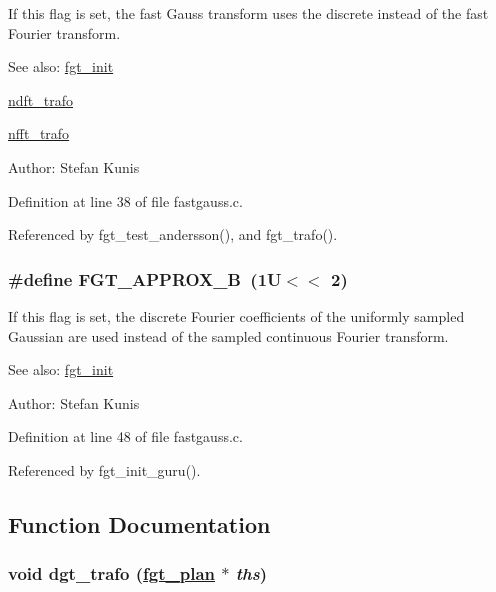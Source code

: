 If this flag is set, the fast Gauss transform uses the discrete instead of the fast Fourier transform. 

\begin{Desc}
\item[See also:]\hyperlink{group__applications__fastgauss_ga3}{fgt\_\-init} 

\hyperlink{group__nfft_ga0}{ndft\_\-trafo} 

\hyperlink{group__nfft_ga2}{nfft\_\-trafo} \end{Desc}
\begin{Desc}
\item[Author:]Stefan Kunis \end{Desc}


Definition at line 38 of file fastgauss.c.

Referenced by fgt\_\-test\_\-andersson(), and fgt\_\-trafo().\hypertarget{group__applications__fastgauss_ga15}{
\subsubsection[FGT\_\-APPROX\_\-B]{\setlength{\rightskip}{0pt plus 5cm}\#define FGT\_\-APPROX\_\-B~(1U$<$$<$ 2)}}
\label{group__applications__fastgauss_ga15}


If this flag is set, the discrete Fourier coefficients of the uniformly sampled Gaussian are used instead of the sampled continuous Fourier transform. 

\begin{Desc}
\item[See also:]\hyperlink{group__applications__fastgauss_ga3}{fgt\_\-init} \end{Desc}
\begin{Desc}
\item[Author:]Stefan Kunis \end{Desc}


Definition at line 48 of file fastgauss.c.

Referenced by fgt\_\-init\_\-guru().

\subsection{Function Documentation}
\hypertarget{group__applications__fastgauss_ga0}{
\subsubsection[dgt\_\-trafo]{\setlength{\rightskip}{0pt plus 5cm}void dgt\_\-trafo (\hyperlink{structfgt__plan}{fgt\_\-plan} $\ast$ {\em ths})}}
\label{group__applications__fastgauss_ga0}


